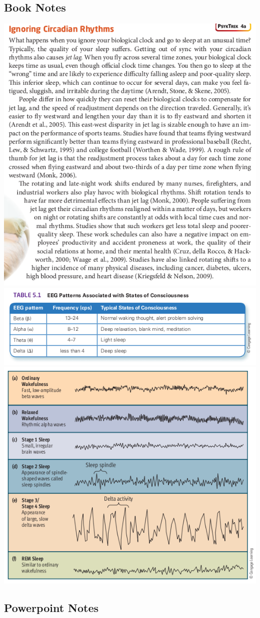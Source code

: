 \documentclass{article}
\begin{document}
\subsection{Book Notes}
\includegraphics[width=\textwidth]{rhythm}
\includegraphics[width=\textwidth]{eeg}
\includegraphics[width=\textwidth]{stages}

\subsection{Powerpoint Notes}

\end{document}
